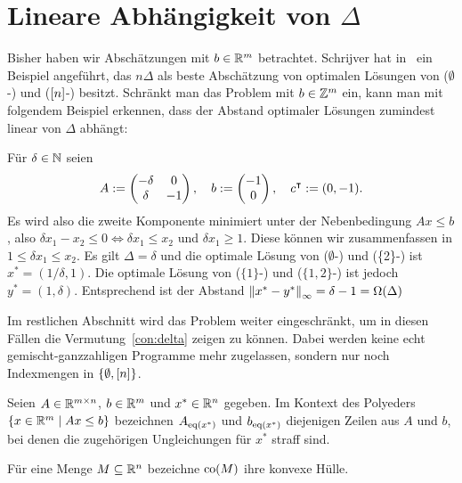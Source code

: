 \section{Lineare Abhängigkeit von $\Delta$}\label{sec:linear}

Bisher haben wir Abschätzungen mit $b\in\mathbb{R}^m$ betrachtet.
Schrijver hat in~\cite[Kapitel~17.2]{Schrijver1986} ein Beispiel angeführt, das $n\Delta$ als beste Abschätzung von optimalen Lösungen von ($\emptyset$-\MIPR) und ($[n]$-\MIPR) besitzt.
Schränkt man das Problem mit $b\in\mathbb{Z}^m$ ein, kann man mit folgendem Beispiel erkennen, dass der Abstand optimaler Lösungen zumindest linear von $\Delta$ abhängt:
\begin{example}
	Für $\delta\in\mathbb{N}$ seien
	$$A:=
	\begin{pmatrix}
	-\delta & 0  \\
	\delta  & -1
	\end{pmatrix},\quad
	b:=\begin{pmatrix} -1 \\ 0 \end{pmatrix},\quad
	c^\intercal:=(0, -1).
	$$
	Es wird also die zweite Komponente minimiert unter der Nebenbedingung $Ax\leq b$, also $\delta x_1-x_2\leq0\Leftrightarrow\delta x_1\leq x_2$ und $\delta x_1\geq 1$.
	Diese können wir zusammenfassen in $1\leq\delta x_1\leq x_2$.
	Es gilt $\Delta=\delta$ und die optimale Lösung von ($\emptyset$-\MIPI) und (\{2\}-\MIPI) ist $x^*=(1/\delta,1)$.
	Die optimale Lösung von ($\{1\}$-\MIPI) und ($\{1, 2\}$-\MIPI) ist jedoch $y^*=(1,\delta)$.
	Entsprechend ist der Abstand $\left\lVert x^*-y^*\right\rVert_\infty=\delta-1=\Omega(\Delta)$
\end{example}

Im restlichen Abschnitt wird das Problem weiter eingeschränkt, um in diesen Fällen die Vermutung~\ref{con:delta} zeigen zu können.
Dabei werden keine echt gemischt-ganzzahligen Programme mehr zugelassen, sondern nur noch Indexmengen in $\{\emptyset, [n] \}$.

\begin{notation}
	Seien $A\in\mathbb{R}^{m\times n}$, $b\in\mathbb{R}^m$ und $x^*\in\mathbb{R}^n$ gegeben.
	Im Kontext des Polyeders $\{ x\in\mathbb{R}^m \mid Ax\leq b \}$ bezeichnen
	$A_{\operatorname{eq}(x^*)}$ und $b_{\operatorname{eq}(x^*)}$ diejenigen Zeilen aus $A$ und $b$, bei denen die zugehörigen Ungleichungen für $x^*$ straff sind.
	
	Für eine Menge $M\subseteq \mathbb{R}^n$ bezeichne $\operatorname{co}(M)$ ihre konvexe Hülle.
\end{notation}

